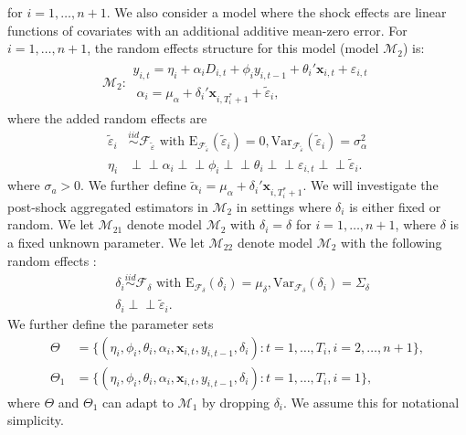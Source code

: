 \documentclass[11pt,3p,review,authoryear]{elsarticle}
\def\mbf#1{\mathbf{#1}} %
\newcommand{\simiid}{\stackrel{iid}{\sim}} %
\newcommand{\indep}{\perp \!\!\! \perp } %
\def\mrm#1{\mathrm{#1}} %
\def\t#1{\tilde{#1}} %
\def\mc#1{\mathcal{#1}} %
\theoremstyle{definition}
\begin{document}
for $i = 1, \ldots, n+1$. We also consider a model where the shock effects are linear functions of covariates with an additional additive mean-zero error. For $i = 1, \ldots, n+1$, the random effects structure for this model (model $\mc{M}_2$) is:
\begin{align}
\mc{M}_2 \colon \begin{array}{l}
  y_{i,t} =\eta_i +\alpha_i D_{i,t} + \phi_i y_{i, t-1} + \theta_i'\mbf{x}_{i,t} + \varepsilon_{i,t}\\[.2cm]
  \; \alpha_i = \mu_{\alpha}+\delta_{i}'\mbf{x}_{i, T_i^*+1}+ \t{\varepsilon}_{i},
\end{array}\label{model2}
\end{align}
 where the added random effects are
\begin{align*}
\t{\varepsilon}_{i} &\simiid  \mc{F}_{\t{\varepsilon}} \text{ with }\mrm{E}_{\mc{F}_{\t{\varepsilon}}}(\t{\varepsilon}_{i})=0, \mrm{Var}_{\mc{F}_{\t{\varepsilon}}}(\t{\varepsilon}_{i})=\sigma^2_{\alpha}\\
\eta_i &\indep  \alpha_i \indep \phi_i \indep \theta_i \indep \varepsilon_{i,t} \indep \t{\varepsilon}_{i}.
\end{align*} 
where $\sigma_a > 0$. We further define 
$\tilde{\alpha}_i=\mu_{\alpha}+\delta_i'\mbf{x}_{i, T_i^*+1}$. 
We will investigate the post-shock aggregated estimators in $\mc{M}_2$ 
in settings where $\delta_i$ is either fixed or random. 
We let $\mc{M}_{21}$ denote model $\mc{M}_{2}$ with $\delta_i = \delta$ for $i= 1, \ldots, n+1$, 
where $\delta$ is a  fixed unknown parameter.
We let $\mc{M}_{22}$ denote model $\mc{M}_{2}$ with the following random effects :
\begin{align*}
&\delta_i\simiid  \mc{F}_{\delta} \text{ with }\mrm{E}_{\mc{F}_{\delta}}(\delta_i)=\mu_{\delta}, \mrm{Var}_{\mc{F}_{\delta}}(\delta_i)=\Sigma_\delta \\
   & \delta_i  \indep \t{\varepsilon}_{i}.
\end{align*}
We further define the parameter sets
\begin{align}
 \Theta &= \{(\eta_i, \phi_i, \theta_i, \alpha_i, \mbf{x}_{i,t}, y_{i,t-1}, \delta_i)\colon    t= 1, \ldots, T_i, i = 2, \ldots, n +1\},\label{parameter} \\
    \Theta_1 &= \{(\eta_i, \phi_i, \theta_i, \alpha_i, \mbf{x}_{i,t}, y_{i,t-1}, \delta_i)\colon  t= 1, \ldots, T_i, i = 1\}, \nonumber
\end{align}
where $\Theta$ and $\Theta_1$ can adapt to $\mc{M}_1$ by dropping $\delta_i$. We assume this for notational simplicity.
\end{document}
